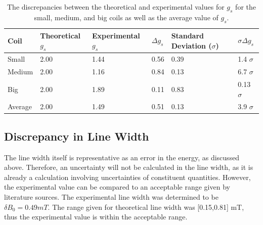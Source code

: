 \documentclass[a4paper]{article}
\begin{document}
\begin{table}[H]
  \caption{The discrepancies between the theoretical and experimental values for
    \( g_s \) for the small, medium, and big coils as well as the average value
    of \( g_s \).}
  \begin{center}
    \begin{tabular}{|l|l|l|l|l|l|}
      \hline
      Coil & Theoretical \( g_s \) & Experimental \( g_s \) & \( \Delta g_s \) &
                                                                                 Standard
                                                                                 Deviation
                                                                                 (\(
                                                                                 \sigma
                                                                                 \)) &
                                                                                 \(
                                                                                 \sigma
                                                                                 \Delta
                                                                                 g_s
                                                                                 \)
      \\
      \hline
      Small & 2.00 & 1.44 & 0.56 & 0.39 & 1.4 \( \sigma \) \\
      Medium & 2.00 & 1.16 & 0.84 & 0.13 & 6.7 \( \sigma \) \\
      Big & 2.00 & 1.89 & 0.11 & 0.83 & 0.13 \( \sigma \) \\
      \hline
      Average & 2.00 & 1.49 & 0.51 & 0.13 & 3.9 \( \sigma \) \\
      \hline
    \end{tabular}
  \end{center}
  \label{tab:discrepancyG}
\end{table}


\subsection{Discrepancy in Line Width}
\qq The line width itself is representative as an error in the energy,
as discussed above. Therefore, an uncertainty will not be calculated
in the line width, as it is already a calculation involving
uncertainties of constituent quantities. However, the experimental
value can be compared to an acceptable range given by literature
sources. The experimental line width was determined to be $\delta B_0
= 0.49 mT$. The range given for theoretical line width was [0.15,0.81]
mT, thus the experimental value is within the acceptable range.
\end{document}
